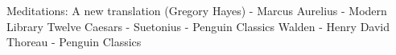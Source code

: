 \begin{thebibliography}{99}

   Meditations: A new translation (Gregory Hayes) - Marcus Aurelius - Modern Library
   Twelve Caesars -  Suetonius - Penguin Classics
   Walden - Henry David Thoreau - Penguin Classics

\end{thebibliography}

